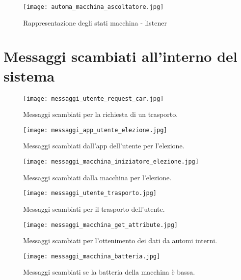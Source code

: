 \begin{figure}[htbp]
	\centering
	\texttt{[image: automa\_macchina\_ascoltatore.jpg]}
	\caption{Rappresentazione degli stati macchina - listener}
	\label{fig:automa_listener}
\end{figure}

\newpage
\section{Messaggi scambiati all'interno del sistema} \label{messaggi_scambiati_appendix}

\begin{figure}[htbp]
	\centering
	\texttt{[image: messaggi\_utente\_request\_car.jpg]}
	\caption{Messaggi scambiati per la richiesta di un trasporto.}
	\label{fig:messaggi_utente_request_car}
\end{figure}

\begin{figure}[htbp]
	\centering
	\texttt{[image: messaggi\_app\_utente\_elezione.jpg]}
	\caption{Messaggi scambiati dall'app dell'utente per l'elezione.}
	\label{fig:messaggi_app_utente_elezione}
\end{figure}

\begin{figure}[htbp]
	\centering
	\texttt{[image: messaggi\_macchina\_iniziatore\_elezione.jpg]}
	\caption{Messaggi scambiati dalla macchina per l'elezione.}
	\label{fig:messaggi_macchina_iniziatore_elezione}
\end{figure}

\begin{figure}[htbp]
	\centering
	\texttt{[image: messaggi\_utente\_trasporto.jpg]}
	\caption{Messaggi scambiati per il trasporto dell'utente.}
	\label{fig:messaggi_utente_trasporto}
\end{figure}

\begin{figure}[htbp]
	\centering
	\texttt{[image: messaggi\_macchina\_get\_attribute.jpg]}
	\caption{Messaggi scambiati per l'ottenimento dei dati da automi interni.}
	\label{fig:messaggi_macchina_get_attribute}
\end{figure}

\begin{figure}[htbp]
	\centering
	\texttt{[image: messaggi\_macchina\_batteria.jpg]}
	\caption{Messaggi scambiati se la batteria della macchina è bassa.}
	\label{fig:messaggi_macchina_batteria}
\end{figure}

